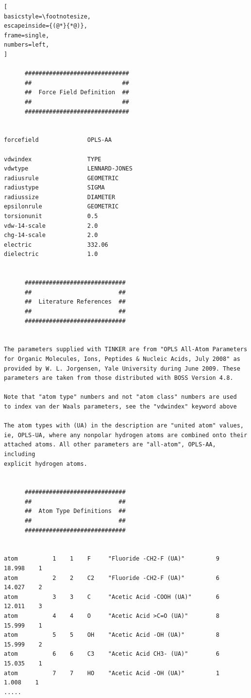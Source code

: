 \documentclass[a4paper,11pt]{scrartcl}
\begin{document}
\begin{lstlisting}[
basicstyle=\footnotesize,
escapeinside={(@*}{*@)},
frame=single,
numbers=left,
]

      ##############################
      ##                          ##
      ##  Force Field Definition  ##
      ##                          ##
      ##############################


forcefield              OPLS-AA

vdwindex                TYPE
vdwtype                 LENNARD-JONES
radiusrule              GEOMETRIC
radiustype              SIGMA
radiussize              DIAMETER
epsilonrule             GEOMETRIC
torsionunit             0.5
vdw-14-scale            2.0
chg-14-scale            2.0
electric                332.06
dielectric              1.0


      #############################
      ##                         ##
      ##  Literature References  ##
      ##                         ##
      #############################


The parameters supplied with TINKER are from "OPLS All-Atom Parameters
for Organic Molecules, Ions, Peptides & Nucleic Acids, July 2008" as
provided by W. L. Jorgensen, Yale University during June 2009. These
parameters are taken from those distributed with BOSS Version 4.8.

Note that "atom type" numbers and not "atom class" numbers are used
to index van der Waals parameters, see the "vdwindex" keyword above

The atom types with (UA) in the description are "united atom" values,
ie, OPLS-UA, where any nonpolar hydrogen atoms are combined onto their
attached atoms. All other parameters are "all-atom", OPLS-AA, including
explicit hydrogen atoms.


      #############################
      ##                         ##
      ##  Atom Type Definitions  ##
      ##                         ##
      #############################


atom          1    1    F     "Fluoride -CH2-F (UA)"         9    18.998    1
atom          2    2    C2    "Fluoride -CH2-F (UA)"         6    14.027    2
atom          3    3    C     "Acetic Acid -COOH (UA)"       6    12.011    3
atom          4    4    O     "Acetic Acid >C=O (UA)"        8    15.999    1
atom          5    5    OH    "Acetic Acid -OH (UA)"         8    15.999    2
atom          6    6    C3    "Acetic Acid CH3- (UA)"        6    15.035    1
atom          7    7    HO    "Acetic Acid -OH (UA)"         1     1.008    1
.....



\end{lstlisting} 
\end{document}
